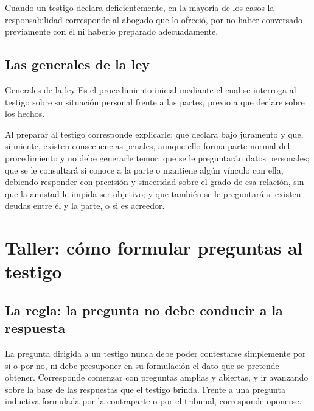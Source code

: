 \documentclass[12pt,oneside]{book}
\begin{document}
\begin{important}
Cuando un testigo declara deficientemente, en la mayoría de los casos la responsabilidad corresponde al abogado que lo ofreció, por no haber conversado previamente con él ni haberlo preparado adecuadamente.
\end{important}

\subsection{Las generales de la ley}

\begin{definition}{Generales de la ley}
Es el procedimiento inicial mediante el cual se interroga al testigo sobre su situación personal frente a las partes, previo a que declare sobre los hechos.
\end{definition}

\begin{important}
Al preparar al testigo corresponde explicarle: que declara bajo juramento y que, si miente, existen consecuencias penales, aunque ello forma parte normal del procedimiento y no debe generarle temor; que se le preguntarán datos personales; que se le consultará si conoce a la parte o mantiene algún vínculo con ella, debiendo responder con precisión y sinceridad sobre el grado de esa relación, sin que la amistad le impida ser objetivo; y que también se le preguntará si existen deudas entre él y la parte, o si es acreedor.
\end{important}

\section{Taller: cómo formular preguntas al testigo}

\subsection{La regla: la pregunta no debe conducir a la respuesta}

\begin{important}
La pregunta dirigida a un testigo nunca debe poder contestarse simplemente por sí o por no, ni debe presuponer en su formulación el dato que se pretende obtener. Corresponde comenzar con preguntas amplias y abiertas, y ir avanzando sobre la base de las respuestas que el testigo brinda. Frente a una pregunta inductiva formulada por la contraparte o por el tribunal, corresponde oponerse.
\end{important}
\end{document}
